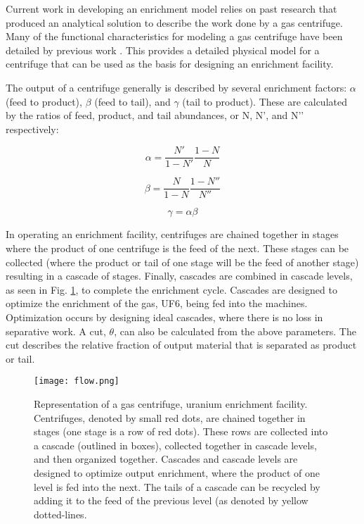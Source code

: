 \documentclass{article}
\begin{document}
Current work in developing an enrichment model relies on past research that produced an analytical solution \cite{raetz.phd} to describe the work done by a gas centrifuge. Many of the functional characteristics for modeling a gas centrifuge have been detailed by previous work \cite{glaser.2008}. This provides a detailed physical model for a centrifuge that can be used as the basis for designing an enrichment facility.

The output of a centrifuge generally is described by several enrichment factors: $\alpha$ (feed to product), $\beta$ (feed to tail), and $\gamma$ (tail to product). These are calculated by the ratios of feed, product, and tail abundances, or N, N’, and N’’ respectively:

\begin{equation}
    \alpha = \frac{N'}{1-N'}\frac{1-N}{N}
\end{equation}

\begin{equation}
    \beta = \frac{N}{1-N}\frac{1-N''}{N''}
\end{equation}

\begin{equation}
    \gamma = \alpha\beta
\end{equation}

In operating an enrichment facility, centrifuges are chained together in stages where the product of one centrifuge is the feed of the next. These stages can be collected (where the product or tail of one stage will be the feed of another stage) resulting in a cascade of stages. Finally, cascades are combined in cascade levels, as seen in Fig. \ref{fig:cascades}, to complete the enrichment cycle. Cascades are designed to optimize the enrichment of the gas, UF6, being fed into the machines. Optimization occurs by designing ideal cascades, where there is no loss in separative work. A cut, $\theta$, can also be calculated from the above parameters. The cut describes the relative fraction of output material that is separated as product or tail.

\begin{figure}
    \centering
    \texttt{[image: flow.png]}
    \caption{Representation of a gas centrifuge, uranium enrichment facility. Centrifuges, denoted by small red dots, are chained together in stages (one stage is a row of red dots). These rows are collected into a cascade (outlined in boxes), collected together in cascade levels, and then organized together. Cascades and cascade levels are designed to optimize output enrichment, where the product of one level is fed into the next. The tails of a cascade can be recycled by adding it to the feed of the previous level (as denoted by yellow dotted-lines.}
    \label{fig:cascades}
\end{figure}
\end{document}
